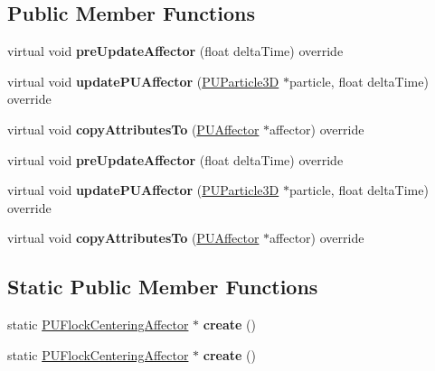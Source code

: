 \subsection*{Public Member Functions}
\begin{DoxyCompactItemize}
\item 
\mbox{\label{classPUFlockCenteringAffector_a9eca18d0a30555a76e9821fb38ff235a}} 
virtual void {\bfseries pre\+Update\+Affector} (float delta\+Time) override
\item 
\mbox{\label{classPUFlockCenteringAffector_a06cc9f9165a4d230ecc17744d01ff970}} 
virtual void {\bfseries update\+P\+U\+Affector} (\hyperlink{structPUParticle3D}{P\+U\+Particle3D} $\ast$particle, float delta\+Time) override
\item 
\mbox{\label{classPUFlockCenteringAffector_a0be5b241eb6b690a33f197286a349226}} 
virtual void {\bfseries copy\+Attributes\+To} (\hyperlink{classPUAffector}{P\+U\+Affector} $\ast$affector) override
\item 
\mbox{\label{classPUFlockCenteringAffector_ab900a2047a89b8dd597993aa1c166bc1}} 
virtual void {\bfseries pre\+Update\+Affector} (float delta\+Time) override
\item 
\mbox{\label{classPUFlockCenteringAffector_acee8a005c9bae6e145e4b54c0b426e13}} 
virtual void {\bfseries update\+P\+U\+Affector} (\hyperlink{structPUParticle3D}{P\+U\+Particle3D} $\ast$particle, float delta\+Time) override
\item 
\mbox{\label{classPUFlockCenteringAffector_aa7c76d13a19f239dfcf974f61cd32b2b}} 
virtual void {\bfseries copy\+Attributes\+To} (\hyperlink{classPUAffector}{P\+U\+Affector} $\ast$affector) override
\end{DoxyCompactItemize}
\subsection*{Static Public Member Functions}
\begin{DoxyCompactItemize}
\item 
\mbox{\label{classPUFlockCenteringAffector_a68bf2a15d5c0e25b42074c4c1d7e12ee}} 
static \hyperlink{classPUFlockCenteringAffector}{P\+U\+Flock\+Centering\+Affector} $\ast$ {\bfseries create} ()
\item 
\mbox{\label{classPUFlockCenteringAffector_ae788af92e2fea28663fbb011cef135bb}} 
static \hyperlink{classPUFlockCenteringAffector}{P\+U\+Flock\+Centering\+Affector} $\ast$ {\bfseries create} ()
\end{DoxyCompactItemize}
